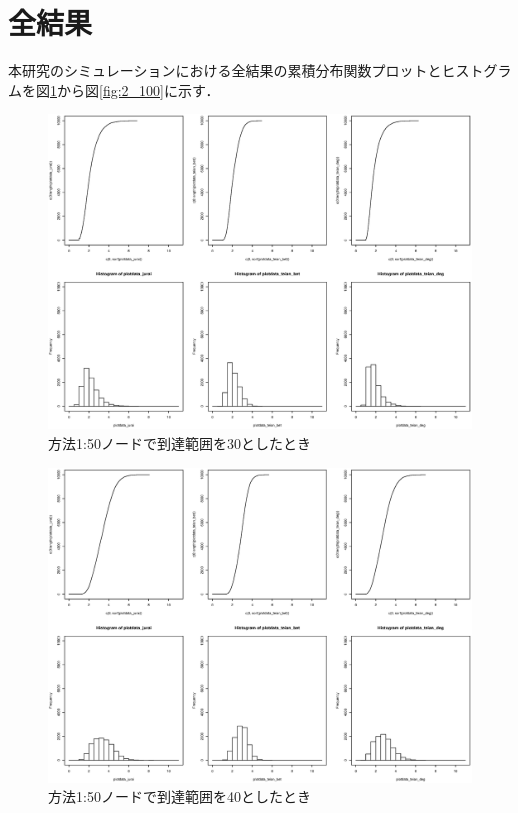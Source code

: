 \section{全結果}
本研究のシミュレーションにおける全結果の累積分布関数プロットとヒストグラムを図\ref{fig:1_50_30}から図\ref{fig:2_100}に示す．
\begin{landscape}
\begin{figure}[H]
  \centering
  \includegraphics[width=1.2\textwidth]{figures/1_50_30.eps}
  \caption{方法1:50ノードで到達範囲を30としたとき}
  \label{fig:1_50_30}
\end{figure}

\begin{figure}[H]
  \centering
  \includegraphics[width=1.2\textwidth]{figures/1_50_40.eps}
  \caption{方法1:50ノードで到達範囲を40としたとき}
  \label{fig:plot}
\end{figure}


\end{landscape}
